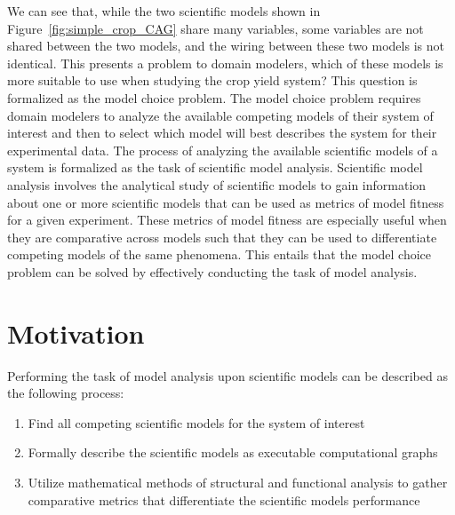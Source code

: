 We can see that, while the two scientific models shown in Figure~\ref{fig:simple_crop_CAG} share many variables, some variables are not shared between the two models, and the wiring between these two models is not identical.
This presents a problem to domain modelers, which of these models is more suitable to use when studying the crop yield system?
This question is formalized as the model choice problem.
The model choice problem requires domain modelers to analyze the available competing models of their system of interest and then to select which model will best describes the system for their experimental data.
The process of analyzing the available scientific models of a system is formalized as the task of scientific model analysis.
Scientific model analysis involves the analytical study of scientific models to gain information about one or more scientific models that can be used as metrics of model fitness for a given experiment.
These metrics of model fitness are especially useful when they are comparative across models such that they can be used to differentiate competing models of the same phenomena.
This entails that the model choice problem can be solved by effectively conducting the task of model analysis.


\section{Motivation\label{sec:motivation}}
Performing the task of model analysis upon scientific models can be described as the following process:
\begin{enumerate}
  \item Find all competing scientific models for the system of interest
  \item Formally describe the scientific models as executable computational graphs
  \item Utilize mathematical methods of structural and functional analysis to gather comparative metrics that differentiate the scientific models performance
\end{enumerate}

